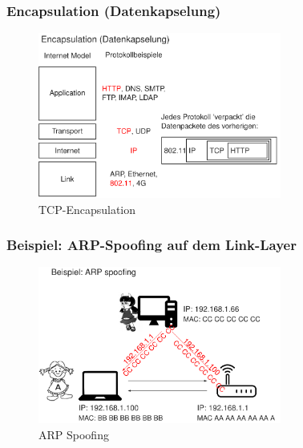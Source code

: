 \documentclass[10pt,a4paper]{article}
\begin{document}
\subsubsection*{Encapsulation (Datenkapselung)}
\begin{figure}[H]
    \begin{center}
    \includegraphics[width=8cm]{images/TCP-Encapsulation.png}
    \caption{TCP-Encapsulation}
    \label{TCP-Encapsulation}
    \end{center}
\end{figure}

\subsubsection*{Beispiel: ARP-Spoofing auf dem Link-Layer}
\begin{figure}[H]
    \begin{center}
    \includegraphics[width=8cm]{images/Beispiel_ARP_Spoofing.png}
    \caption{ARP Spoofing}
    \label{ARP Spoofing}
    \end{center}
\end{figure}
\end{document}
